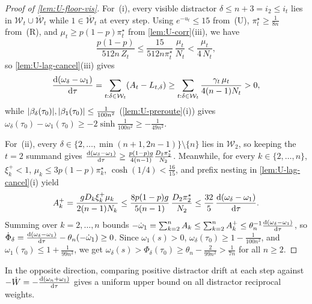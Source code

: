 \begin{proof}[Proof of \cref{lem:U-floor-vis}]
For~(i), every visible distractor $\delta \le n+3 = i_2 \le i_t$ lies in $\mathcal W_t \cup \overline{\mathcal W}_t$ while $1 \in \overline{\mathcal W}_t$ at every step. Using $e^{-u_t} \le 15$ from~(U), $\pi_t^\star \ge \frac{1}{8n}$ from~(R), and $\mu_t \ge p(1-p)\pi_t^\star$ from \cref{lem:U-corr}(iii), we have
\[
  \frac{p(1-p)}{512n\,Z_t}
  \le \frac{15}{512n\pi_t^\star}\,\frac{\mu_t}{N_t}
  < \frac{\mu_t}{4\,N_t},
\]
so \cref{lem:U-lag-cancel}(iii) gives
\[
  \ddtau{(\omega_\delta - \omega_1)} = \sum_{t:\delta\in\mathcal W_t}(A_t - L_{t,\delta})
  \ge \sum_{t:\delta\in\mathcal W_t}\frac{\gamma_t\,\mu_t}{4(n-1)N_t} > 0,
\]
while $\lvert\beta_\delta(\tau_0)\rvert, \lvert\beta_1(\tau_0)\rvert \le \frac{1}{100n^2}$ (\cref{lem:U-preroute}(i)) gives $\omega_\delta(\tau_0) - \omega_1(\tau_0) \ge -2\sinh\frac{1}{100n^2} \ge -\frac{1}{49n^2}$.

For~(ii), every $\delta \in \{2,\ldots,\min(n+1, 2n-1)\}\setminus\{n\}$ lies in $\mathcal W_2$, so keeping the $t = 2$ summand gives $\ddtau{(\omega_\delta - \omega_1)} \ge \frac{p(1-p)g}{4(n-1)}\frac{D_2\pi_2^\star}{N_2}$. Meanwhile, for every $k \in \{2,\ldots,n\}$, $\xi_k^+ < 1$, $\mu_k \le 3p(1-p)\pi_k^\star$, $\cosh(1/4) < \frac{16}{15}$, and prefix nesting in \cref{lem:U-lag-cancel}(i) yield
\[
  A_k^+ = \frac{g D_k\xi_k^+\mu_k}{2(n-1)N_k} \le \frac{8p(1-p)g}{5(n-1)}\,\frac{D_2\pi_2^\star}{N_2} \le \frac{32}{5}\,\ddtau{(\omega_\delta - \omega_1)}.
\]
Summing over $k = 2,\ldots,n$ bounds $-\dot\omega_1 = \sum_{k=2}^n A_k \le \sum_{k=2}^n A_k^+ \le \theta_n^{-1}\ddtau{(\omega_\delta - \omega_1)}$, so $\dot\Phi_\delta = \ddtau{(\omega_\delta - \omega_1)} - \theta_n(-\dot\omega_1) \ge 0$. Since $\omega_1(s) > 0$, $\omega_\delta(\tau_0) \ge 1 - \frac{1}{100n^2}$, and $\omega_1(\tau_0) \le 1 + \frac{1}{99n^2}$, we get $\omega_\delta(s) > \Phi_\delta(\tau_0) \ge \theta_n - \frac{2}{99n^2} > \frac{1}{7n}$ for all $n \ge 2$.
\end{proof}

In the opposite direction, comparing positive distractor drift at each step against $-\dot W = -\ddtau{(\omega_n + \omega_1)}$ gives a uniform upper bound on all distractor reciprocal weights.

